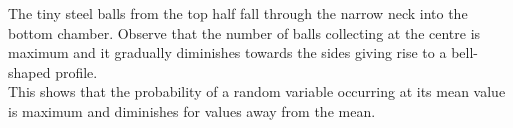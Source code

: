 The tiny steel balls from the top half fall through the narrow neck into the bottom chamber. Observe that the number of balls collecting at the centre is maximum and it gradually diminishes towards the sides giving rise to a bell-shaped profile.
 \\ This shows that the probability of a random variable occurring at its mean value is maximum and diminishes for values away from the mean.
 \cite{enwiki:1026848272}
 \cite{article}

